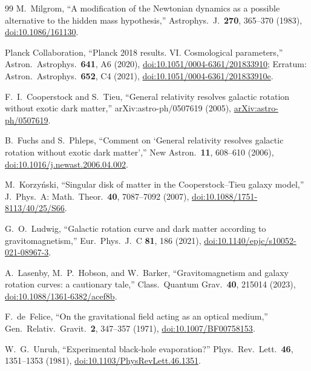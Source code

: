 \documentclass[a4paper,10pt,twocolumn]{ltjsarticle}
\begin{document}
\begin{thebibliography}{99}
M.~Milgrom, ``A modification of the Newtonian dynamics as a possible
alternative to the hidden mass hypothesis,''
Astrophys.\ J.\ \textbf{270}, 365--370 (1983),
\href{https://doi.org/10.1086/161130}{doi:10.1086/161130}.

Planck Collaboration, ``Planck 2018 results. VI. Cosmological
parameters,'' Astron.\ Astrophys.\ \textbf{641}, A6 (2020),
\href{https://doi.org/10.1051/0004-6361/201833910}
{doi:10.1051/0004-6361/201833910};
Erratum: Astron.\ Astrophys.\ \textbf{652}, C4 (2021),
\href{https://doi.org/10.1051/0004-6361/201833910e}
{doi:10.1051/0004-6361/201833910e}.

F.~I.~Cooperstock and S.~Tieu, ``General relativity resolves galactic
rotation without exotic dark matter,'' arXiv:astro-ph/0507619 (2005),
\href{https://arxiv.org/abs/astro-ph/0507619}
{arXiv:astro-ph/0507619}.

B.~Fuchs and S.~Phleps, ``Comment on `General relativity resolves
galactic rotation without exotic dark matter','' New Astron.\
\textbf{11}, 608--610 (2006),
\href{https://doi.org/10.1016/j.newast.2006.04.002}
{doi:10.1016/j.newast.2006.04.002}.

M.~Korzy\'nski, ``Singular disk of matter in the Cooperstock--Tieu
galaxy model,'' J.\ Phys.\ A: Math.\ Theor.\ \textbf{40}, 7087--7092
(2007),
\href{https://doi.org/10.1088/1751-8113/40/25/S66}
{doi:10.1088/1751-8113/40/25/S66}.

G.~O.~Ludwig, ``Galactic rotation curve and dark matter according to
gravitomagnetism,'' Eur.\ Phys.\ J.\ C \textbf{81}, 186 (2021),
\href{https://doi.org/10.1140/epjc/s10052-021-08967-3}
{doi:10.1140/epjc/s10052-021-08967-3}.

A.~Lasenby, M.~P.~Hobson, and W.~Barker, ``Gravitomagnetism and galaxy
rotation curves: a cautionary tale,'' Class.\ Quantum Grav.\
\textbf{40}, 215014 (2023),
\href{https://doi.org/10.1088/1361-6382/acef8b}
{doi:10.1088/1361-6382/acef8b}.

F.~de~Felice, ``On the gravitational field acting as an optical
medium,'' Gen.\ Relativ.\ Gravit.\ \textbf{2}, 347--357 (1971),
\href{https://doi.org/10.1007/BF00758153}{doi:10.1007/BF00758153}.

\bibitem{Unruh1981}
W.~G.~Unruh, ``Experimental black-hole evaporation?''
Phys.\ Rev.\ Lett.\ \textbf{46}, 1351--1353 (1981),
\href{https://doi.org/10.1103/PhysRevLett.46.1351}
{doi:10.1103/PhysRevLett.46.1351}.


\end{thebibliography}
\end{document}
